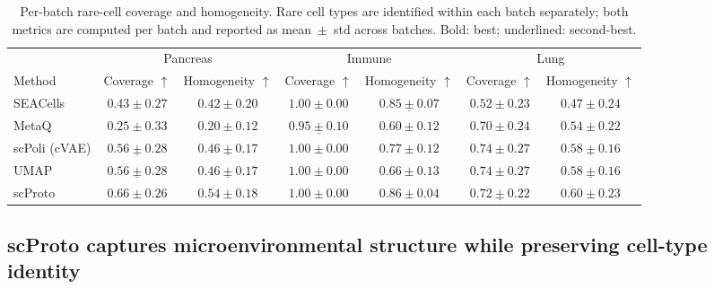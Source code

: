 \begin{table}[t]
\centering
\caption{Per-batch rare-cell coverage and homogeneity. Rare cell types are identified within each batch separately; both metrics are computed per batch and reported as mean~$\pm$~std across batches. Bold: best; underlined: second-best.}
\label{tab:rare_cells}
\tiny
\setlength{\tabcolsep}{1pt}
\begin{tabular}{lcc|cc|cc}
\toprule
 & \multicolumn{2}{c}{Pancreas}
 & \multicolumn{2}{c}{Immune}
 & \multicolumn{2}{c}{Lung} \\
\cmidrule(lr){2-3} \cmidrule(lr){4-5} \cmidrule(lr){6-7}
Method
& Coverage $\uparrow$
& Homogeneity $\uparrow$
& Coverage $\uparrow$
& Homogeneity $\uparrow$
& Coverage $\uparrow$
& Homogeneity $\uparrow$ \\
\midrule

SEACells
& $0.43 \pm 0.27$ & $0.42 \pm 0.20$
& $\mathbf{1.00 \pm 0.00}$ & $\underline{0.85 \pm 0.07}$
& $0.52 \pm 0.23$ & $0.47 \pm 0.24$ \\

MetaQ
& $0.25 \pm 0.33$ & $0.20 \pm 0.12$
& $\underline{0.95 \pm 0.10}$ & $0.60 \pm 0.12$
& $0.70 \pm 0.24$ & $0.54 \pm 0.22$ \\

scPoli (cVAE)
& $\underline{0.56 \pm 0.28}$ & $\underline{0.46 \pm 0.17}$
& $\mathbf{1.00 \pm 0.00}$ & $0.77 \pm 0.12$
& $\mathbf{0.74 \pm 0.27}$ & $\underline{0.58 \pm 0.16}$ \\

UMAP
& $\underline{0.56 \pm 0.28}$ & $\underline{0.46 \pm 0.17}$
& $\mathbf{1.00 \pm 0.00}$ & $0.66 \pm 0.13$
& $\mathbf{0.74 \pm 0.27}$ & $\underline{0.58 \pm 0.16}$ \\

\midrule

scProto
& $\mathbf{0.66 \pm 0.26}$ & $\mathbf{0.54 \pm 0.18}$
& $\mathbf{1.00 \pm 0.00}$ & $\mathbf{0.86 \pm 0.04}$
& $\underline{0.72 \pm 0.22}$ & $\mathbf{0.60 \pm 0.23}$ \\

\bottomrule
\end{tabular}
\setlength{\tabcolsep}{6pt}
\end{table}

\subsection{scProto captures microenvironmental structure while preserving cell-type identity}

